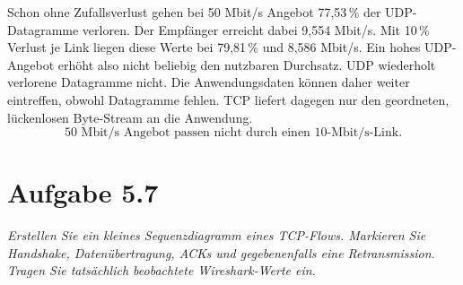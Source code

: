 \documentclass[a4paper,11pt]{article}
\newif\ifexplain
\newcommand{\aufgabe}[1]{\section*{Aufgabe #1}}
\newcommand{\angabe}[1]{\textit{#1}\par\smallskip}
\newcommand{\explain}[1]{\ifexplain\begin{erklbox}#1\end{erklbox}\fi}
\begin{document}
Schon ohne Zufallsverlust gehen bei 50 Mbit/s Angebot 77,53\,\% der UDP-Datagramme verloren. Der Empfänger erreicht dabei 9,554 Mbit/s. Mit 10\,\% Verlust je Link liegen diese Werte bei 79,81\,\% und 8,586 Mbit/s. Ein hohes UDP-Angebot erhöht also nicht beliebig den nutzbaren Durchsatz.
UDP wiederholt verlorene Datagramme nicht. Die Anwendungsdaten können daher
weiter eintreffen, obwohl Datagramme fehlen. TCP liefert dagegen nur den
geordneten, lückenlosen Byte-Stream an die Anwendung.
\[\boxed{\text{50 Mbit/s Angebot passen nicht durch einen 10-Mbit/s-Link.}}\]
\explain{iperf3 kann mit UDP mehr senden, als das Netz weiterleiten kann.
Dann gehen Datagramme schon durch die Überlast des Linkpuffers verloren.
Die zusätzliche Zufallsverlustrate kommt dazu. Zwei unabhängige Links mit
je 5 Prozent Verlust haben für ein Datagramm eine Überlebenschance von
$0{,}95\cdot0{,}95$. Das entspricht 9,75 Prozent Verlust über beide Links,
nicht bloß fünf Prozent. Bei zehn Prozent je Link sind es 19 Prozent.
Diese Erwartungswerte gelten ohne zusätzliche Überlast, nicht für den
50M-Versuch. Außerdem nutzt iperf3 auch beim UDP-Test einen TCP-Steuerkanal.
Ein gescheiterter Steuerkanal wäre keine gemessene UDP-Rate; solche Versuche
werden nicht als erfolgreiche Messung verwendet.}

\aufgabe{5.7}
\angabe{Erstellen Sie ein kleines Sequenzdiagramm eines TCP-Flows. Markieren Sie Handshake, Datenübertragung, ACKs und gegebenenfalls eine Retransmission. Tragen Sie tatsächlich beobachtete Wireshark-Werte ein.}
\end{document}
